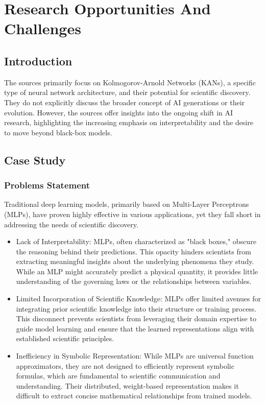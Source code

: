 \chapter{Research Opportunities And Challenges}

\nomenclature{}{}

\section{Introduction}

The sources primarily focus on Kolmogorov-Arnold Networks (KANs), a specific
type of neural network architecture, and their potential for scientific
discovery. They do not explicitly discuss the broader concept of AI generations
or their evolution. However, the sources offer insights into the ongoing shift
in AI research, highlighting the increasing emphasis on interpretability and
the desire to move beyond black-box models.

\section{Case Study}

\subsection{Problems Statement}

Traditional deep learning models, primarily based on Multi-Layer Perceptrons
(MLPs), have proven highly effective in various applications, yet they fall
short in addressing the needs of scientific discovery.

\begin{itemize}
    \item Lack of Interpretability: MLPs, often characterized as "black boxes," obscure
          the reasoning behind their predictions. This opacity hinders scientists from
          extracting meaningful insights about the underlying phenomena they study. While
          an MLP might accurately predict a physical quantity, it provides little
          understanding of the governing laws or the relationships between variables.
    \item Limited Incorporation of Scientific Knowledge: MLPs offer limited avenues for
          integrating prior scientific knowledge into their structure or training
          process. This disconnect prevents scientists from leveraging their domain
          expertise to guide model learning and ensure that the learned representations
          align with established scientific principles.
    \item Inefficiency in Symbolic Representation: While MLPs are universal function
          approximators, they are not designed to efficiently represent symbolic
          formulas, which are fundamental to scientific communication and understanding.
          Their distributed, weight-based representation makes it difficult to extract
          concise mathematical relationships from trained models.
\end{itemize}


